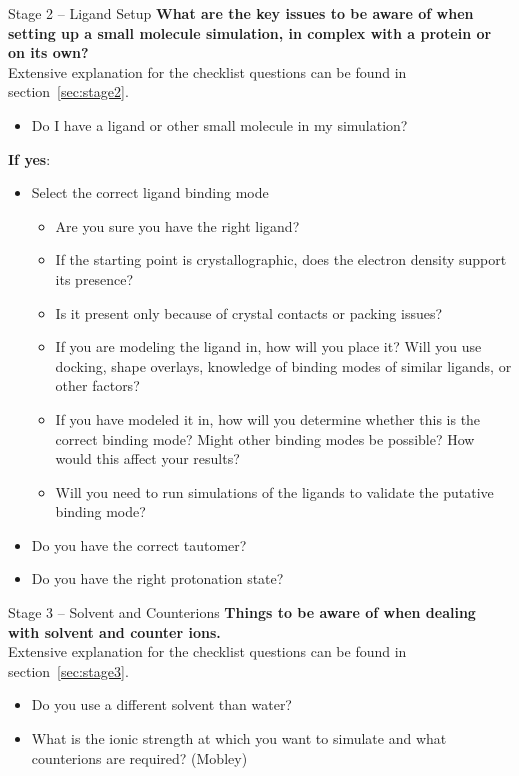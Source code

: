 \documentclass[9pt,bestpractices]{livecoms}
\begin{document}
\begin{Checklists*}[p!]


\begin{checklist}{Stage 2 -- Ligand Setup}
\textbf{What are the key issues to be aware of when setting up a small molecule simulation, in complex with a protein or on its own?}\\
Extensive explanation for the checklist questions can be found in section~\ref{sec:stage2}.
\begin{itemize}
\item Do I have a ligand or other small molecule in my simulation?
\end{itemize}
\textbf{If yes}:
\begin{itemize}
\item Select the correct ligand binding mode %
    \begin{itemize}
    \item Are you sure you have the right ligand?
    \item If the starting point is crystallographic, does the electron density support its presence? 
    \item Is it present only because of crystal contacts or packing issues?
    \item If you are modeling the ligand in, how will you place it? %
Will you use docking, shape overlays, knowledge of binding modes of similar ligands, or other factors?
    \item If you have modeled it in, how will you determine whether this is the correct binding mode? Might other binding modes be possible? How would this affect your results?
    \item Will you need to run simulations of the ligands to validate the putative binding mode?
    \end{itemize}
   \item Do you have the correct tautomer? 
   \item Do you have the right protonation state?
\end{itemize}
\end{checklist}

\begin{checklist}{Stage 3 -- Solvent and Counterions}
\textbf{Things to be aware of when dealing with solvent and counter ions.}\\
Extensive explanation for the checklist questions can be found in section~\ref{sec:stage3}.
\begin{itemize}
\item Do you use a different solvent than water?
\item What is the ionic strength at which you want to simulate and what counterions are required?  (Mobley)
\end{itemize}
\end{checklist}

\end{Checklists*}
\end{document}
